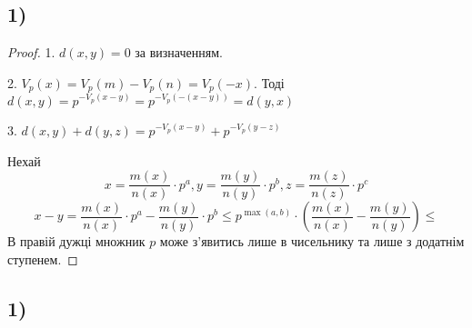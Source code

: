 \documentclass[11pt, a4paper]{article} %
\begin{document}
\subsection*{1)}
\begin{proof}
    1. $d(x,y) = 0$ за визначенням.

    2. $V_p(x) = V_p(m) - V_p(n) = V_p(-x)$. Тоді $d(x,y) = p^{-V_p(x-y)} = p^{-V_p(-(x-y))}= d(y,x)$

    3. $d(x,y) + d(y,z) = p^{-V_p(x-y)} + p^{-V_p(y-z)}$

    Нехай 
    $$x = \frac{m(x)}{n(x)} \cdot p^a, y = \frac{m(y)}{n(y)} \cdot p^b, z = \frac{m(z)}{n(z)} \cdot p^c$$
    $$x-y = \frac{m(x)}{n(x)} \cdot p^a - \frac{m(y)}{n(y)} \cdot p^b 
    \le p^{\max(a,b)} \cdot (\frac{m(x)}{n(x)} - \frac{m(y)}{n(y)}) \le 
    $$
    В правій дужці множник $p$ може з'явитись лише в чисельнику та лише з додатнім ступенем.
    
\end{proof}

\subsection*{1)}
\end{document}
